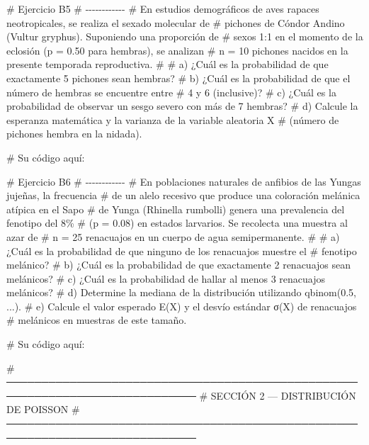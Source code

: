 \documentclass[
  spanish,
  letterpaper,
  DIV=11,
  numbers=noendperiod]{scrreprt}
\newenvironment{Shaded}{\begin{snugshade}}{\end{snugshade}}
\newcommand{\CommentTok}[1]{\textcolor[rgb]{0.37,0.37,0.37}{#1}}
\begin{document}
\begin{Shaded}
\begin{Highlighting}[]
\CommentTok{\# Ejercicio B5}
\CommentTok{\# {-}{-}{-}{-}{-}{-}{-}{-}{-}{-}{-}{-}}
\CommentTok{\# En estudios demográficos de aves rapaces neotropicales, se realiza el sexado molecular de}
\CommentTok{\# pichones de Cóndor Andino (Vultur gryphus). Suponiendo una proporción de}
\CommentTok{\# sexos 1:1 en el momento de la eclosión (p = 0.50 para hembras), se analizan}
\CommentTok{\# n = 10 pichones nacidos en la presente temporada reproductiva.}
\CommentTok{\#}
\CommentTok{\# a) ¿Cuál es la probabilidad de que exactamente 5 pichones sean hembras?}
\CommentTok{\# b) ¿Cuál es la probabilidad de que el número de hembras se encuentre entre}
\CommentTok{\#    4 y 6 (inclusive)?}
\CommentTok{\# c) ¿Cuál es la probabilidad de observar un sesgo severo con más de 7 hembras?}
\CommentTok{\# d) Calcule la esperanza matemática y la varianza de la variable aleatoria X}
\CommentTok{\#    (número de pichones hembra en la nidada).}

\CommentTok{\# Su código aquí:}


\CommentTok{\# Ejercicio B6}
\CommentTok{\# {-}{-}{-}{-}{-}{-}{-}{-}{-}{-}{-}{-}}
\CommentTok{\# En poblaciones naturales de anfibios de las Yungas jujeñas, la frecuencia}
\CommentTok{\# de un alelo recesivo que produce una coloración melánica atípica en el Sapo}
\CommentTok{\# de Yunga (Rhinella rumbolli) genera una prevalencia del fenotipo del 8\%}
\CommentTok{\# (p = 0.08) en estados larvarios. Se recolecta una muestra al azar de}
\CommentTok{\# n = 25 renacuajos en un cuerpo de agua semipermanente.}
\CommentTok{\#}
\CommentTok{\# a) ¿Cuál es la probabilidad de que ninguno de los renacuajos muestre el}
\CommentTok{\#    fenotipo melánico?}
\CommentTok{\# b) ¿Cuál es la probabilidad de que exactamente 2 renacuajos sean melánicos?}
\CommentTok{\# c) ¿Cuál es la probabilidad de hallar al menos 3 renacuajos melánicos?}
\CommentTok{\# d) Determine la mediana de la distribución utilizando qbinom(0.5, ...).}
\CommentTok{\# e) Calcule el valor esperado E(X) y el desvío estándar σ(X) de renacuajos}
\CommentTok{\#    melánicos en muestras de este tamaño.}

\CommentTok{\# Su código aquí:}


\CommentTok{\# ─────────────────────────────────────────────────────────────────────────────}
\CommentTok{\#  SECCIÓN 2 — DISTRIBUCIÓN DE POISSON}
\CommentTok{\# ─────────────────────────────────────────────────────────────────────────────}


\end{Highlighting}
\end{Shaded}
\end{document}
